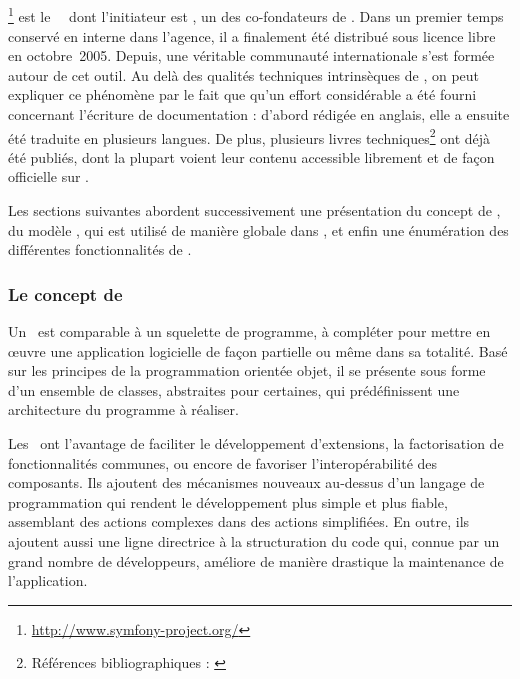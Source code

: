 \subsection{\asf}
\label{section:outils_sf}

\asf\footnote{\url{http://www.symfony-project.org/}} est le \afm\ \aphp\ dont l'initiateur est \apotencier, un des co-fondateurs de \asl. Dans un premier temps conservé en interne dans l'agence, il a finalement été distribué sous licence libre en octobre~2005. Depuis, une véritable communauté internationale s'est formée autour de cet outil. Au delà des qualités techniques intrinsèques de \asf, on peut expliquer ce phénomène par le fait que qu'un effort considérable a été fourni concernant l'écriture de documentation : d'abord rédigée en anglais, elle a ensuite été traduite en plusieurs langues. De plus, plusieurs livres techniques\footnote{Références bibliographiques : \cite{practicalsf} \cite{sfrefguide} \cite{cahierssf} \cite{moresf} \cite{thebook}} ont déjà été publiés, dont la plupart voient leur contenu accessible librement et de façon officielle sur \ainternet.

Les sections suivantes abordent successivement une présentation du concept de \afm, du modèle \amvc, qui est utilisé de manière globale dans \asf, et enfin une énumération des différentes fonctionnalités de \asf.


\subsubsection{Le concept de \afm}

Un \afm\ est comparable à un squelette de programme, à compléter pour mettre en œuvre une application logicielle de façon partielle ou même dans sa totalité. Basé sur les principes de la programmation orientée objet, il se présente sous forme d'un ensemble de classes, abstraites pour certaines, qui prédéfinissent une architecture du programme à réaliser.

Les \afms\ ont l'avantage de faciliter le développement d'extensions, la factorisation de fonctionnalités communes, ou encore de favoriser l'interopérabilité des composants. Ils ajoutent des mécanismes nouveaux au-dessus d'un langage de programmation qui rendent le développement plus simple et plus fiable, assemblant des actions complexes dans des actions simplifiées. En outre, ils ajoutent aussi une ligne directrice à la structuration du code qui, connue par un grand nombre de développeurs, améliore de manière drastique la maintenance de l'application.

